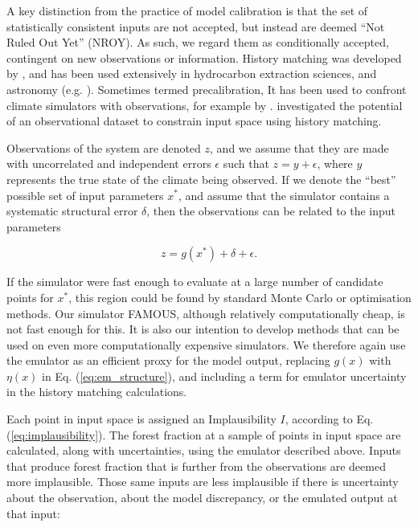 \documentclass[esd, manuscript]{copernicus}
\begin{document}
A key distinction from the practice of model calibration is that the set of statistically consistent inputs are not accepted, but instead are deemed ``Not Ruled Out Yet'' (NROY). As such, we regard them as conditionally accepted, contingent on new observations or information. History matching was developed by \cite{craig1997pressure}, and has been used extensively in hydrocarbon extraction sciences, and astronomy (e.g. \cite{vernon2010galaxy}). Sometimes termed precalibration, It has been used to confront climate simulators with observations, for example by \cite{lee2016aerosol, williamson2013history, holden2009precalibration}. \cite{mcneall2013potential} investigated the potential of an observational dataset to constrain input space using history matching.

Observations of the system are denoted $z$, and we assume that they are made with uncorrelated and independent errors $\epsilon$ such that $z=y+\epsilon$, where $y$ represents the true state of the climate being observed. If we denote the ``best'' possible set of input parameters $x^{*}$, and assume that the simulator contains a systematic structural error $\delta$, then the observations can be related to the input parameters

\begin{equation}\label{eq:em_structure}
z=g(x^*) + \delta + \epsilon.
\end{equation}

If the simulator were fast enough to evaluate at a large number of candidate points for $x^{*}$, this region could be found by standard Monte Carlo or optimisation methods. Our simulator FAMOUS, although relatively computationally cheap, is not fast enough for this. It is also our intention to develop methods that can be used on even more computationally expensive simulators. We therefore again use the emulator as an efficient proxy for the model output, replacing $g(x)$ with $\eta(x)$ in Eq. (\ref{eq:em_structure}), and including a term for emulator uncertainty in the history matching calculations.

Each point in input space is assigned an Implausibility $I$, according to Eq. (\ref{eq:implausibility}). The forest fraction at a sample of points in input space are calculated, along with uncertainties, using the emulator described above. Inputs that produce forest fraction that is further from the observations are deemed more implausible. Those same inputs are less implausible if there is uncertainty about the observation, about the model discrepancy, or the emulated output at that input:
\end{document}
